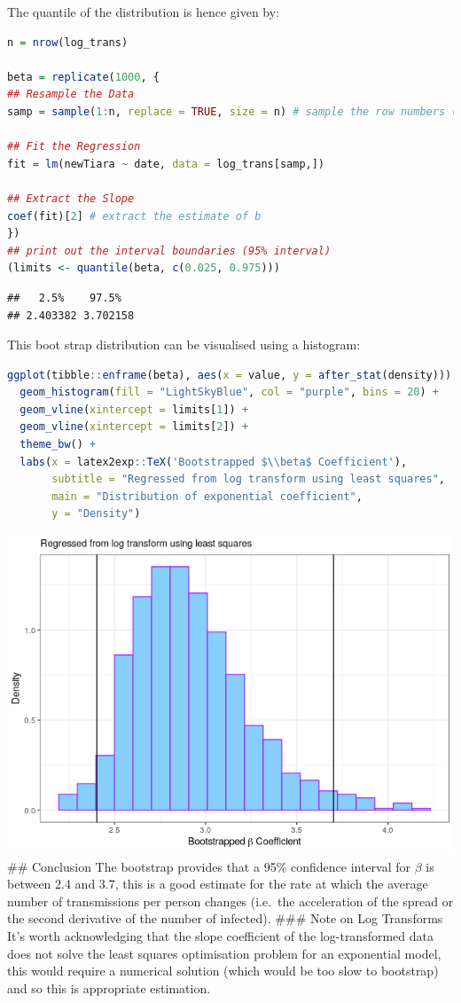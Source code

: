 \documentclass{article}
\begin{document}
The quantile of the distribution is hence given by:

\begin{lstlisting}[language=R]
n = nrow(log_trans)

beta = replicate(1000, {
## Resample the Data
samp = sample(1:n, replace = TRUE, size = n) # sample the row numbers (with replacement)

## Fit the Regression
fit = lm(newTiara ~ date, data = log_trans[samp,])

## Extract the Slope
coef(fit)[2] # extract the estimate of b
})
## print out the interval boundaries (95% interval)
(limits <- quantile(beta, c(0.025, 0.975)))
\end{lstlisting}

\begin{lstlisting}
##   2.5%    97.5%
## 2.403382 3.702158
\end{lstlisting}

This boot strap distribution can be visualised using a histogram:

\begin{lstlisting}[language=R]
ggplot(tibble::enframe(beta), aes(x = value, y = after_stat(density))) +
  geom_histogram(fill = "LightSkyBlue", col = "purple", bins = 20) +
  geom_vline(xintercept = limits[1]) +
  geom_vline(xintercept = limits[2]) +
  theme_bw() +
  labs(x = latex2exp::TeX('Bootstrapped $\\beta$ Coefficient'),
       subtitle = "Regressed from log transform using least squares", 
       main = "Distribution of exponential coefficient", 
       y = "Density")
\end{lstlisting}

\includegraphics{main_files/figure-html/unnamed-chunk-18-1.png} \#\#
Conclusion The bootstrap provides that a 95\% confidence interval for
\(\beta\) is between 2.4 and 3.7, this is a good estimate for the rate at
which the average number of transmissions per person changes (i.e.~the
acceleration of the spread or the second derivative of the number of
infected). \#\#\# Note on Log Transforms It's worth acknowledging that
the slope coefficient of the log-transformed data does not solve the
least squares optimisation problem for an exponential model, this would
require a numerical solution (which would be too slow to bootstrap) and
so this is appropriate estimation.
\end{document}
